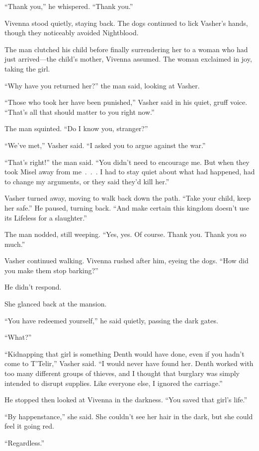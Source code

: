 “Thank you,” he whispered. “Thank you.”

Vivenna stood quietly, staying back. The dogs continued to lick Vasher’s hands, though they noticeably avoided Nightblood.

The man clutched his child before finally surrendering her to a woman who had just arrived—the child’s mother, Vivenna assumed. The woman exclaimed in joy, taking the girl.

“Why have you returned her?” the man said, looking at Vasher.

“Those who took her have been punished,” Vasher said in his quiet, gruff voice. “That’s all that should matter to you right now.”

The man squinted. “Do I know you, stranger?”

“We’ve met,” Vasher said. “I asked you to argue against the war.”

“That’s right!” the man said. “You didn’t need to encourage me. But when they took Misel away from me~.~.~. I had to stay quiet about what had happened, had to change my arguments, or they said they’d kill her.”

Vasher turned away, moving to walk back down the path. “Take your child, keep her safe.” He paused, turning back. “And make certain this kingdom doesn’t use its Lifeless for a slaughter.”

The man nodded, still weeping. “Yes, yes. Of course. Thank you. Thank you so much.”

Vasher continued walking. Vivenna rushed after him, eyeing the dogs. “How did you make them stop barking?”

He didn’t respond.

She glanced back at the mansion.

“You have redeemed yourself,” he said quietly, passing the dark gates.

“What?”

“Kidnapping that girl is something Denth would have done, even if you hadn’t come to T’Telir,” Vasher said. “I would never have found her. Denth worked with too many different groups of thieves, and I thought that burglary was simply intended to disrupt supplies. Like everyone else, I ignored the carriage.”

He stopped then looked at Vivenna in the darkness. “You saved that girl’s life.”

“By happenstance,” she said. She couldn’t see her hair in the dark, but she could feel it going red.

“Regardless.”

